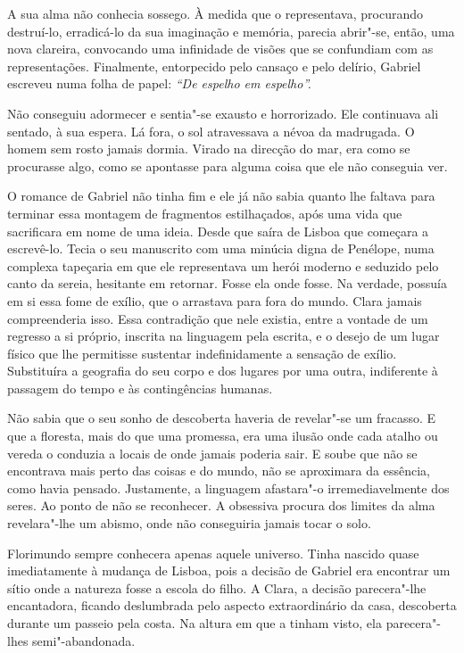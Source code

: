 A sua alma não conhecia sossego. À medida que o representava, procurando
destruí-lo, erradicá-lo da sua imaginação e memória, parecia abrir"-se,
então, uma nova clareira, convocando uma infinidade de visões que se
confundiam com as representações. Finalmente, entorpecido pelo cansaço e
pelo delírio, Gabriel escreveu numa folha de papel: \emph{``De espelho
em espelho''.}

Não conseguiu adormecer e sentia"-se exausto e horrorizado. Ele
continuava ali sentado, à sua espera. Lá fora, o sol atravessava a névoa
da madrugada. O homem sem rosto jamais dormia. Virado na direcção do
mar, era como se procurasse algo, como se apontasse para alguma coisa
que ele não conseguia ver.

O romance de Gabriel não tinha fim e ele já não sabia quanto lhe faltava
para terminar essa montagem de fragmentos estilhaçados, após uma vida
que sacrificara em nome de uma ideia. Desde que saíra de Lisboa que
começara a escrevê-lo. Tecia o seu manuscrito com uma minúcia digna de
Penélope, numa complexa tapeçaria em que ele representava um herói
moderno e seduzido pelo canto da sereia, hesitante em retornar. Fosse
ela onde fosse. Na verdade, possuía em si essa fome de exílio, que o
arrastava para fora do mundo. Clara jamais compreenderia isso. Essa
contradição que nele existia, entre a vontade de um regresso a si
próprio, inscrita na linguagem pela escrita, e o desejo de um lugar
físico que lhe permitisse sustentar indefinidamente a sensação de
exílio. Substituíra a geografia do seu corpo e dos lugares por uma
outra, indiferente à passagem do tempo e às contingências humanas.

Não sabia que o seu sonho de descoberta haveria de revelar"-se um
fracasso. E que a floresta, mais do que uma promessa, era uma ilusão
onde cada atalho ou vereda o conduzia a locais de onde jamais poderia
sair. E soube que não se encontrava mais perto das coisas e do mundo,
não se aproximara da essência, como havia pensado. Justamente, a
linguagem afastara"-o irremediavelmente dos seres. Ao ponto de não se
reconhecer. A obsessiva procura dos limites da alma revelara"-lhe um
abismo, onde não conseguiria jamais tocar o solo.

Florimundo sempre conhecera apenas aquele universo. Tinha nascido quase
imediatamente à mudança de Lisboa, pois a decisão de Gabriel era
encontrar um sítio onde a natureza fosse a escola do filho. A Clara, a
decisão parecera"-lhe encantadora, ficando deslumbrada pelo aspecto
extraordinário da casa, descoberta durante um passeio pela costa. Na
altura em que a tinham visto, ela parecera"-lhes semi"-abandonada.

